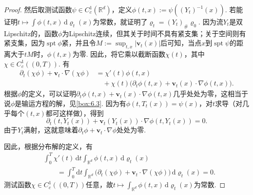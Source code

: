 \begin{proof}
然后取测试函数$\psi\in C_c^1(\mathbb R^d)$，定义$\phi(t,x):=\psi((Y_t)^{-1}(x))$. 若能证明$t\mapsto\int\phi(t,x)\,\mathrm d\varrho_t(x)$为常数，就证明了$\varrho_t=(Y_t)_\#\varrho_0$. 因为流$Y_t$是双Lipschitz的，函数$\phi$为Lipschitz连续，但其关于时间不具有紧支集；关于空间则有紧支集，因为$\operatorname{spt}\phi$紧，并且令$M:=\sup_{t,x}|\mathbf v_t(x)|$后可知，当点$x$到$\operatorname{spt}\psi$的距离大于$tM$时，$\phi(t,x)$为零. 因此，将它乘以截断函数$\chi(t)$，其中$\chi\in C_c^1((0,T))$. 有
\begin{equation*}
\begin{aligned}
 \partial_t(\chi\phi)+\mathbf v_t\cdot\nabla(\chi\phi)
 &=\chi'(t)\phi(t,x)\\
 &\quad+\chi(t)\bigl(\partial_t\phi(t,x)
                     +\mathbf v_t(x)\cdot\nabla\phi(t,x)\bigr).
\end{aligned}
\end{equation*}
根据$\phi$的定义，可以证明$\partial_t\phi(t,x)+\mathbf v_t(x)\cdot\nabla\phi(t,x)$几乎处处为零，这相当于说$\phi$是输运方程的解，见\autoref{box:6.3}. 因为有$\phi(t,T_t(x))=\psi(x)$，对$t$求导（对几乎每个$(t,x)$都可这样做），得到
\[
 \partial_t(t,Y_t(x))+\mathbf v_t(Y_t(x))\cdot\nabla\phi(t,Y_t(x))=0.
\]
由于$Y_t$满射，这就意味着$\partial_t\phi+\mathbf v_t\cdot\nabla\phi$处处为零.

因此，根据分布解的定义，有
\begin{equation*}
\begin{aligned}
 &\int_0^T\chi'(t)\,\mathrm dt\int_{\mathbb R^d}\phi(t,x)\,\mathrm d\varrho_t(x)\\
 &\qquad=\int_0^T\mathrm dt\int_{\mathbb R^d}
       \bigl(\partial_t(\chi\phi)+\mathbf v_t\cdot\nabla(\chi\phi)\bigr)
                          \,\mathrm d\varrho_t(x)=0.
\end{aligned}
\end{equation*}
测试函数$\chi\in C_c^1((0,T))$任意，故$t\mapsto\int_{\mathbb R^d}\phi(t,x)\,\mathrm d\varrho_t(x)$为常数.
\end{proof}
